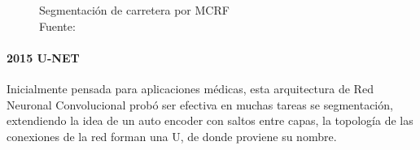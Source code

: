 \begin{figure}[H]
    \centering
    \qquad
    \caption[Segmentación de carretera por MCRF]{Segmentación de carretera por MCRF\\Fuente: \citep{segmentation-crf}}
\end{figure}

\paragraph{2015 U-NET}
Inicialmente pensada para aplicaciones médicas, esta arquitectura de Red Neuronal Convolucional probó ser efectiva en muchas tareas se segmentación, extendiendo la idea de un auto encoder con saltos entre capas, la topología de las conexiones de la red forman una U, de donde proviene su nombre. \citep{u-net}

